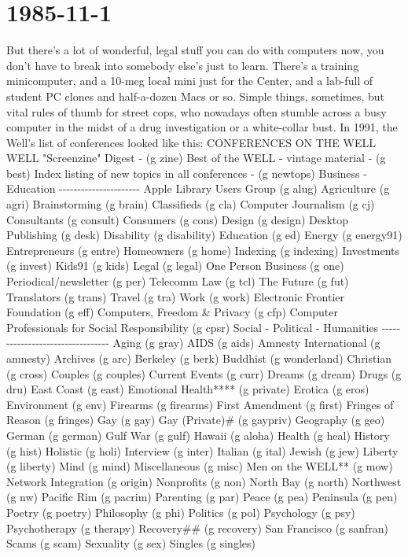 \documentclass{article}
\begin{document}
\section*{1985{-}11{-}1}
But there's a lot of wonderful, legal stuff you can do with computers now, you don't have to break into somebody else's just to learn. There's a training minicomputer, and a 10{-}meg local mini just for the Center, and a lab{-}full of student PC clones and half{-}a{-}dozen Macs or so. Simple things, sometimes, but vital rules of thumb for street cops, who nowadays often stumble across a busy computer in the midst of a drug investigation or a white{-}collar bust. In 1991, the Well's list of conferences looked like this:               CONFERENCES ON THE WELL          WELL "Screenzine" Digest {-} (g zine)       Best of the WELL {-} vintage material {-} (g best)   Index listing of new topics in all conferences {-} (g newtops)             Business {-} Education            {-}{-}{-}{-}{-}{-}{-}{-}{-}{-}{-}{-}{-}{-}{-}{-}{-}{-}{-}{-}{-}{-}   Apple Library Users Group (g alug)  Agriculture (g agri) Brainstorming     (g brain)   Classifieds (g cla) Computer Journalism  (g cj)    Consultants (g consult) Consumers       (g cons)   Design    (g design) Desktop Publishing   (g desk)   Disability  (g disability) Education       (g ed)    Energy    (g energy91) Entrepreneurs     (g entre)   Homeowners  (g home) Indexing        (g indexing) Investments (g invest) Kids91         (g kids)   Legal    (g legal) One Person Business  (g one) Periodical/newsletter (g per) Telecomm Law      (g tcl)    The Future  (g fut) Translators      (g trans)   Travel    (g tra) Work          (g work)           Electronic Frontier Foundation  (g eff)         Computers, Freedom \& Privacy   (g cfp)  Computer Professionals for Social Responsibility (g cpsr)             Social {-} Political {-} Humanities         {-}{-}{-}{-}{-}{-}{-}{-}{-}{-}{-}{-}{-}{-}{-}{-}{-}{-}{-}{-}{-}{-}{-}{-}{-}{-}{-}{-}{-}{-}{-}{-}{-}   Aging         (g gray)   AIDS     (g aids) Amnesty International (g amnesty)  Archives   (g arc) Berkeley        (g berk)   Buddhist   (g wonderland) Christian       (g cross)   Couples   (g couples) Current Events     (g curr)   Dreams    (g dream) Drugs         (g dru)    East Coast  (g east) Emotional Health****  (g private)  Erotica   (g eros) Environment      (g env)    Firearms   (g firearms) First Amendment    (g first)   Fringes of Reason (g fringes) Gay          (g gay)    Gay (Private)\# (g gaypriv) Geography       (g geo)    German    (g german) Gulf War        (g gulf)   Hawaii    (g aloha) Health         (g heal)   History   (g hist) Holistic        (g holi)   Interview  (g inter) Italian        (g ital)   Jewish    (g jew) Liberty        (g liberty)  Mind     (g mind) Miscellaneous     (g misc)   Men on the WELL** (g mow) Network Integration  (g origin)  Nonprofits  (g non) North Bay       (g north)   Northwest  (g nw) Pacific Rim      (g pacrim)  Parenting  (g par) Peace         (g pea)    Peninsula  (g pen) Poetry         (g poetry)  Philosophy  (g phi) Politics        (g pol)    Psychology  (g psy) Psychotherapy     (g therapy)  Recovery\#\#  (g recovery) San Francisco     (g sanfran)  Scams    (g scam) Sexuality       (g sex)    Singles   (g singles) 
\end{document}
